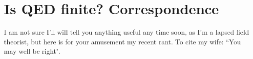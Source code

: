 
\section{Is QED finite? Correspondence}
\label{sect:correspnd}


\begin{bartlett}{
I am not sure I'll will tell you anything useful any time soon, as I'm a
lapsed field theorist, but here is for your amusement my
 {recent rant}. To
cite my wife: ``You may well be right".
        }
\end{bartlett}
\bigskip



